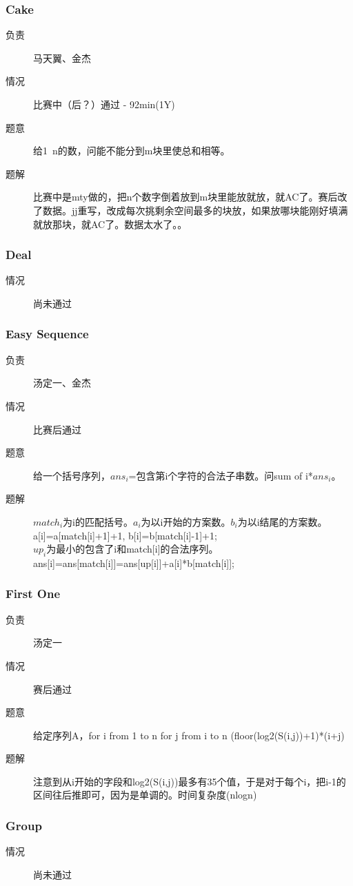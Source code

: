 \documentclass[a4paper, 11pt, nofonts, nocap, fancyhdr]{ctexart}
\newcommand{\problem}[1]{\subsubsection{#1}}
\begin{document}
\problem{Cake}

\begin{description}
\item[负责] 马天翼、金杰
\item[情况] 比赛中（后？）通过 - 92min(1Y)
\item[题意]
给1~n的数，问能不能分到m块里使总和相等。
\item[题解]
比赛中是mty做的，把n个数字倒着放到m块里能放就放，就AC了。赛后改了数据。jj重写，改成每次挑剩余空间最多的块放，如果放哪块能刚好填满就放那块，就AC了。数据太水了。。
\end{description}

\problem{Deal}

\begin{description}
\item[情况] 尚未通过
\end{description}

\problem{Easy Sequence}

\begin{description}
\item[负责] 汤定一、金杰
\item[情况] 比赛后通过
\item[题意]
给一个括号序列，$ans_i$=包含第i个字符的合法子串数。问sum of i*$ans_i$。
\item[题解]
$match_i$为i的匹配括号。$a_i$为以i开始的方案数。$b_i$为以i结尾的方案数。a[i]=a[match[i]+1]+1, b[i]=b[match[i]-1]+1;\\
$up_i$为最小的包含了i和match[i]的合法序列。ans[i]=ans[match[i]]=ans[up[i]]+a[i]*b[match[i]];
\end{description}

\problem{First One}

\begin{description}
\item[负责] 汤定一
\item[情况] 赛后通过
\item[题意]
给定序列A，for i from 1 to n for j from i to n (floor(log2(S(i,j))+1)*(i+j)
\item[题解]
注意到从i开始的字段和log2(S(i,j))最多有35个值，于是对于每个i，把i-1的区间往后推即可，因为是单调的。时间复杂度(nlogn)
\end{description}

\problem{Group}

\begin{description}
\item[情况] 尚未通过
\end{description}
\end{document}

